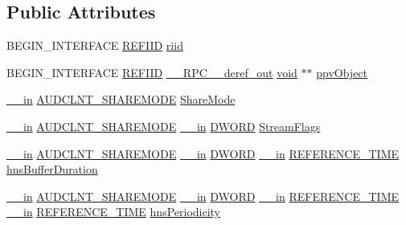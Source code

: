\subsection*{Public Attributes}
\begin{DoxyCompactItemize}
\item 
B\+E\+G\+I\+N\+\_\+\+I\+N\+T\+E\+R\+F\+A\+CE \hyperlink{px__win__ds_8c_a80ec49c8ae61e234197d5071d2df497d}{R\+E\+F\+I\+ID} \hyperlink{struct_i_audio_client_vtbl_ab975afebe7ac3eff154b2bbde0490cf6}{riid}
\item 
B\+E\+G\+I\+N\+\_\+\+I\+N\+T\+E\+R\+F\+A\+CE \hyperlink{px__win__ds_8c_a80ec49c8ae61e234197d5071d2df497d}{R\+E\+F\+I\+ID} \hyperlink{rpcsal_8h_a23bc188526f10656f9c79d950f6c3192}{\+\_\+\+\_\+\+R\+P\+C\+\_\+\+\_\+deref\+\_\+out} \hyperlink{sound_8c_ae35f5844602719cf66324f4de2a658b3}{void} $\ast$$\ast$ \hyperlink{struct_i_audio_client_vtbl_af28cfc2beda55dd9f19fe7c6f27dc950}{ppv\+Object}
\item 
\hyperlink{sal_8h_a3f6b8655e1aa9dfc15a9029f0343009e}{\+\_\+\+\_\+in} \hyperlink{_audio_session_types_8h_a0957067f6e0b63274f50931b31ed0ce5}{A\+U\+D\+C\+L\+N\+T\+\_\+\+S\+H\+A\+R\+E\+M\+O\+DE} \hyperlink{struct_i_audio_client_vtbl_aeb3c2e00a923b0d0f5abbfe34e069c1e}{Share\+Mode}
\item 
\hyperlink{sal_8h_a3f6b8655e1aa9dfc15a9029f0343009e}{\+\_\+\+\_\+in} \hyperlink{_audio_session_types_8h_a0957067f6e0b63274f50931b31ed0ce5}{A\+U\+D\+C\+L\+N\+T\+\_\+\+S\+H\+A\+R\+E\+M\+O\+DE} \hyperlink{sal_8h_a3f6b8655e1aa9dfc15a9029f0343009e}{\+\_\+\+\_\+in} \hyperlink{mapinls_8h_ad342ac907eb044443153a22f964bf0af}{D\+W\+O\+RD} \hyperlink{struct_i_audio_client_vtbl_a4c09038199eeb68300b0a31bdcac8913}{Stream\+Flags}
\item 
\hyperlink{sal_8h_a3f6b8655e1aa9dfc15a9029f0343009e}{\+\_\+\+\_\+in} \hyperlink{_audio_session_types_8h_a0957067f6e0b63274f50931b31ed0ce5}{A\+U\+D\+C\+L\+N\+T\+\_\+\+S\+H\+A\+R\+E\+M\+O\+DE} \hyperlink{sal_8h_a3f6b8655e1aa9dfc15a9029f0343009e}{\+\_\+\+\_\+in} \hyperlink{mapinls_8h_ad342ac907eb044443153a22f964bf0af}{D\+W\+O\+RD} \hyperlink{sal_8h_a3f6b8655e1aa9dfc15a9029f0343009e}{\+\_\+\+\_\+in} \hyperlink{ksmedia_8h_a83927f70641d4e9a344563bd9ddb15ae}{R\+E\+F\+E\+R\+E\+N\+C\+E\+\_\+\+T\+I\+ME} \hyperlink{struct_i_audio_client_vtbl_a890929b32f177c96805c53e446fc075a}{hns\+Buffer\+Duration}
\item 
\hyperlink{sal_8h_a3f6b8655e1aa9dfc15a9029f0343009e}{\+\_\+\+\_\+in} \hyperlink{_audio_session_types_8h_a0957067f6e0b63274f50931b31ed0ce5}{A\+U\+D\+C\+L\+N\+T\+\_\+\+S\+H\+A\+R\+E\+M\+O\+DE} \hyperlink{sal_8h_a3f6b8655e1aa9dfc15a9029f0343009e}{\+\_\+\+\_\+in} \hyperlink{mapinls_8h_ad342ac907eb044443153a22f964bf0af}{D\+W\+O\+RD} \hyperlink{sal_8h_a3f6b8655e1aa9dfc15a9029f0343009e}{\+\_\+\+\_\+in} \hyperlink{ksmedia_8h_a83927f70641d4e9a344563bd9ddb15ae}{R\+E\+F\+E\+R\+E\+N\+C\+E\+\_\+\+T\+I\+ME} \hyperlink{sal_8h_a3f6b8655e1aa9dfc15a9029f0343009e}{\+\_\+\+\_\+in} \hyperlink{ksmedia_8h_a83927f70641d4e9a344563bd9ddb15ae}{R\+E\+F\+E\+R\+E\+N\+C\+E\+\_\+\+T\+I\+ME} \hyperlink{struct_i_audio_client_vtbl_a2bd94de18e52e2f483ff1588ae1395fb}{hns\+Periodicity}
$$
\end{DoxyCompactItemize}
